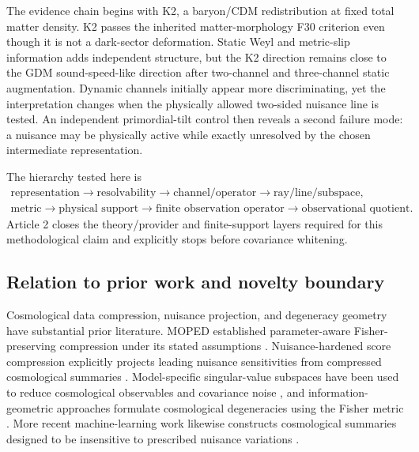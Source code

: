 \documentclass[11pt]{article}
\begin{document}
The evidence chain begins with K2, a baryon/CDM redistribution at fixed total matter density. K2 passes the inherited matter-morphology F30 criterion even though it is not a dark-sector deformation. Static Weyl and metric-slip information adds independent structure, but the K2 direction remains close to the GDM sound-speed-like direction after two-channel and three-channel static augmentation. Dynamic channels initially appear more discriminating, yet the interpretation changes when the physically allowed two-sided nuisance line is tested. An independent primordial-tilt control then reveals a second failure mode: a nuisance may be physically active while exactly unresolved by the chosen intermediate representation.

The hierarchy tested here is
\begin{equation}
\begin{gathered}
\text{representation}\rightarrow\text{resolvability}\rightarrow\text{channel/operator}\rightarrow\text{ray/line/subspace},\\
\text{metric}\rightarrow\text{physical support}\rightarrow\text{finite observation operator}\rightarrow\text{observational quotient}.
\end{gathered}
\end{equation}
Article 2 closes the theory/provider and finite-support layers required for this methodological claim and explicitly stops before covariance whitening.

\subsection{Relation to prior work and novelty boundary}
Cosmological data compression, nuisance projection, and degeneracy geometry have substantial prior literature. MOPED established parameter-aware Fisher-preserving compression under its stated assumptions \citep{HeavensJimenezLahav2000MOPED}. Nuisance-hardened score compression explicitly projects leading nuisance sensitivities from compressed cosmological summaries \citep{AlsingWandelt2019NuisanceHardened}. Model-specific singular-value subspaces have been used to reduce cosmological observables and covariance noise \citep{PhilcoxEtAl2021Subspace}, and information-geometric approaches formulate cosmological degeneracies using the Fisher metric \citep{GieselEtAl2021InformationGeometry}. More recent machine-learning work likewise constructs cosmological summaries designed to be insensitive to prescribed nuisance variations \citep{AkhmetzhanovaMishraSharmaDvorkin2024}.
\end{document}
